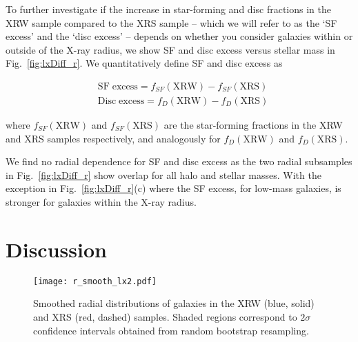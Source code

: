 To further investigate if the increase in star-forming and disc
fractions in the XRW sample compared to the XRS sample -- which we
will refer to as the `SF excess' and the `disc excess' -- depends on
whether you consider galaxies within or outside of the X-ray radius,
we show SF and disc excess versus stellar mass in
Fig.~\ref{fig:lxDiff_r}.  We quantitatively define SF and disc excess
as

\begin{align}
  & \mathrm{SF}\;\mathrm{excess} = f_{SF}(\mathrm{XRW}) -
  f_{SF}(\mathrm{XRS}) \label{eq:f_sf} \\
  & \mathrm{Disc}\;\mathrm{excess} = f_{D}(\mathrm{XRW}) -
  f_{D}(\mathrm{XRS}) \label{eq:f_d}
\end{align}

\noindent
where $f_{SF}(\mathrm{XRW})$ and $f_{SF}(\mathrm{XRS})$ are the
star-forming fractions in the XRW and XRS samples respectively, and
analogously for $f_D(\mathrm{XRW})$ and $f_D(\mathrm{XRS})$.
\par
We find no radial dependence for SF and disc excess as the two radial
subsamples in Fig.~\ref{fig:lxDiff_r} show overlap for all halo and
stellar masses.  With the exception in Fig.~\ref{fig:lxDiff_r}(c) where
the SF excess, for low-mass galaxies, is stronger for galaxies within
the X-ray radius. 

\section{Discussion}
\label{sec:discussion_x}

\begin{figure}[!tp]
  \centering
  \texttt{[image: r\_smooth\_lx2.pdf]}
  \caption[Radial distributions of galaxies in the XRW and XRS
    samples]{Smoothed radial distributions of galaxies in the XRW
    (blue, solid) and XRS (red, dashed) samples.  Shaded regions correspond to
  $2\sigma$ confidence intervals obtained from random bootstrap resampling.}
  \label{fig:r_smooth_lx2}
\end{figure}

